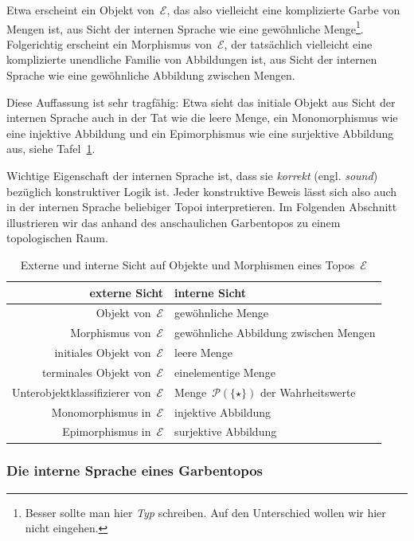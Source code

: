 \documentclass[a4paper,ngerman,12pt]{scrartcl}
\theoremstyle{definition}
\theoremstyle{plain}
\theoremstyle{remark}
\newcommand{\E}{\mathcal{E}}
\renewcommand{\P}{\mathcal{P}}
\renewcommand{\_}{\mathpunct{.}\,}
\newcommand{\?}{\,{:}\,}
\begin{document}
Etwa erscheint ein Objekt von~$\E$, das also vielleicht eine komplizierte Garbe
von Mengen ist, aus Sicht der internen Sprache wie eine gewöhnliche
Menge\footnote{Besser sollte man hier \emph{Typ} schreiben. Auf den
Unterschied wollen wir hier nicht eingehen.}. Folgerichtig erscheint ein
Morphismus von~$\E$, der tatsächlich vielleicht eine komplizierte unendliche
Familie von Abbildungen ist, aus Sicht der internen Sprache wie eine
gewöhnliche Abbildung zwischen Mengen.

Diese Auffassung ist sehr tragfähig: Etwa sieht das initiale Objekt aus Sicht
der internen Sprache auch in der Tat wie die leere Menge, ein Monomorphismus
wie eine injektive Abbildung und ein Epimorphismus wie eine surjektive
Abbildung aus, siehe Tafel~\ref{tafel:externintern}.

Wichtige Eigenschaft der internen Sprache ist, dass sie \emph{korrekt} (engl.
\emph{sound}) bezüglich konstruktiver Logik ist. Jeder konstruktive Beweis
lässt sich also auch in der internen Sprache beliebiger Topoi interpretieren.
Im Folgenden Abschnitt illustrieren wir das anhand des anschaulichen
Garbentopos zu einem topologischen Raum.

\begin{table}
  \centering
  \small
  \setlength{\extrarowheight}{0.3em}
  \begin{tabular}{@{}r|l@{}}
    externe Sicht & interne Sicht
    \\\hline
    Objekt von~$\E$ & gewöhnliche Menge \\
    Morphismus von~$\E$ & gewöhnliche Abbildung zwischen Mengen \\
    initiales Objekt von~$\E$ & leere Menge \\
    terminales Objekt von~$\E$ & einelementige Menge \\
    Unterobjektklassifizierer von~$\E$ & Menge~$\P(\{\star\})$ der
    Wahrheitswerte \\
    Monomorphismus in~$\E$ & injektive Abbildung \\
    Epimorphismus in~$\E$ & surjektive Abbildung
  \end{tabular}
  \caption{\label{tafel:externintern}Externe und interne Sicht auf Objekte und
  Morphismen eines Topos~$\E$}
\end{table}


\subsubsection*{Die interne Sprache eines Garbentopos}
\end{document}
